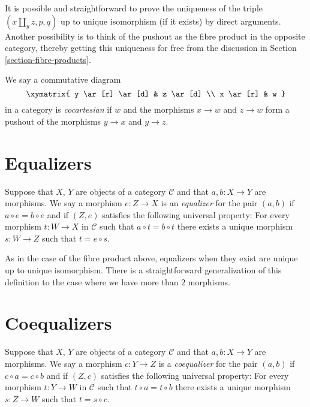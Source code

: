 \noindent
It is possible and straightforward to prove the uniqueness of the triple
$(x\amalg_y z, p, q)$ up to unique isomorphism (if it exists) by direct
arguments. Another possibility is to think of the pushout as the
fibre product in the opposite category, thereby getting this uniqueness for
free from the discussion in Section \ref{section-fibre-products}.

\begin{definition}
\label{definition-cocartesian}
We say a commutative diagram
$$
\xymatrix{
y \ar[r] \ar[d] & z \ar[d] \\
x \ar[r] & w
}
$$
in a category is {\it cocartesian} if $w$ and the morphisms $x \to w$ and
$z \to w$ form a pushout of the morphisms $y \to x$ and $y \to z$.
\end{definition}


\section{Equalizers}
\label{section-equalizers}

\begin{definition}
\label{definition-equalizers}
Suppose that $X$, $Y$ are objects of a category $\mathcal{C}$
and that $a, b : X \to Y$ are morphisms. We say a morphism
$e : Z \to X$ is an {\it equalizer} for the pair $(a, b)$ if
$a \circ e = b \circ e$ and if $(Z, e)$ satisfies the following
universal property: For every morphism $t : W \to X$
in $\mathcal{C}$ such that $a \circ t = b \circ t$ there exists
a unique morphism $s : W \to Z$ such that $t = e \circ s$.
\end{definition}

\noindent
As in the case of the fibre product above, equalizers when
they exist are unique up to unique isomorphism. There is a
straightforward generalization of this definition to the
case where we have more than $2$ morphisms.

\section{Coequalizers}
\label{section-coequalizers}

\begin{definition}
\label{definition-coequalizers}
Suppose that $X$, $Y$ are objects of a category $\mathcal{C}$
and that $a, b : X \to Y$ are morphisms. We say a morphism
$c : Y \to Z$ is a {\it coequalizer} for the pair $(a, b)$ if
$c \circ a = c \circ b$ and if $(Z, c)$ satisfies the following
universal property: For every morphism $t : Y \to W$
in $\mathcal{C}$ such that $t \circ a = t \circ b$ there exists
a unique morphism $s : Z \to W$ such that $t = s \circ c$.
\end{definition}

